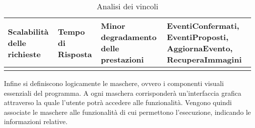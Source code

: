 \begin{longtable} {|P{3.5cm}|P{2cm}|P{3.5cm}|P{6cm}|}
        \hline
        Scalabilità delle richieste         & Tempo di Risposta  & Minor degradamento delle prestazioni                                     & EventiConfermati, EventiProposti, AggiornaEvento, RecuperaImmagini                                                                          \\
        \hline
    \caption{Analisi dei vincoli}
\end{longtable}


Infine si definiscono logicamente le maschere, 
ovvero i componenti visuali essenziali del programma.
A ogni maschera corrisponderà un'interfaccia grafica 
attraverso la quale l'utente potrà accedere alle funzionalità.
Vengono quindi associate le maschere alle funzionalità di cui permettono l'esecuzione, 
indicando le informazioni relative.\\
\\


